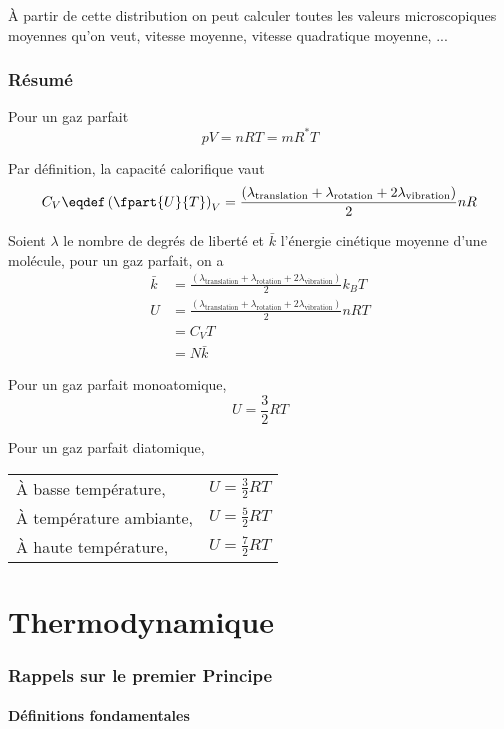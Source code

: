 À partir de cette distribution on peut calculer
toutes les valeurs microscopiques moyennes qu'on veut,
vitesse moyenne, vitesse quadratique moyenne, ...

\section{Résumé}

Pour un gaz parfait
\[ pV = nRT = mR^*T \]

Par définition, la capacité calorifique vaut
\[ C_V \eqdef \left(\fpart{U}{T}\right)_V
= \frac{(\lambda_\mathrm{translation} + \lambda_\mathrm{rotation} +
2\lambda_\mathrm{vibration})}{2}nR \]

Soient $\lambda$ le nombre de degrés de liberté
et $\bar k$ l'énergie cinétique moyenne d'une molécule,
pour un gaz parfait, on a
\begin{align*}
  \bar k & = \frac{(\lambda_\mathrm{translation} + \lambda_\mathrm{rotation} +
  2\lambda_\mathrm{vibration})}{2}k_BT\\
  U & = \frac{(\lambda_\mathrm{translation} + \lambda_\mathrm{rotation} +
  2\lambda_\mathrm{vibration})}{2}nRT\\
  & = C_V T\\
  & = N \bar k
\end{align*}

Pour un gaz parfait monoatomique,
\[ U = \frac 32 RT \]

Pour un gaz parfait diatomique,
\begin{center}
  \begin{tabular}{|l|l|}
    \hline
    À basse température, &
    \( U = \frac 32 RT \)\\
    À température ambiante, &
    \( U = \frac 52 RT \)\\
    À haute température, &
    \( U = \frac 72 RT \)\\
    \hline
  \end{tabular}
\end{center}

\part{Thermodynamique}
\section{Rappels sur le premier Principe}
\subsection{Définitions fondamentales}
